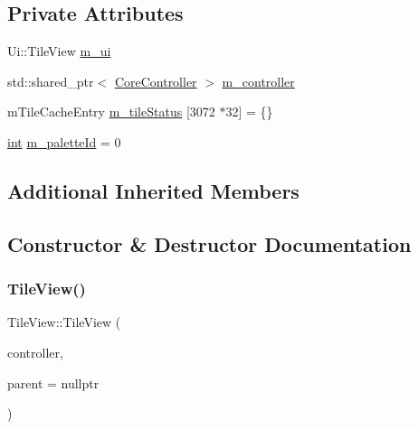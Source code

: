 \subsection*{Private Attributes}
\begin{DoxyCompactItemize}
\item 
Ui\+::\+Tile\+View \mbox{\hyperlink{class_q_g_b_a_1_1_tile_view_a39583b2b32b232918e23c63deb5f2113}{m\+\_\+ui}}
\item 
std\+::shared\+\_\+ptr$<$ \mbox{\hyperlink{class_q_g_b_a_1_1_core_controller}{Core\+Controller}} $>$ \mbox{\hyperlink{class_q_g_b_a_1_1_tile_view_a66508a82664b6f7160c35445481ed170}{m\+\_\+controller}}
\item 
m\+Tile\+Cache\+Entry \mbox{\hyperlink{class_q_g_b_a_1_1_tile_view_a56211cc11156c156d156f11f1395ba9e}{m\+\_\+tile\+Status}} \mbox{[}3072 $\ast$32\mbox{]} = \{\}
\item 
\mbox{\hyperlink{ioapi_8h_a787fa3cf048117ba7123753c1e74fcd6}{int}} \mbox{\hyperlink{class_q_g_b_a_1_1_tile_view_a9a230b2cb71c7c9416d6573cc36242ee}{m\+\_\+palette\+Id}} = 0
\end{DoxyCompactItemize}
\subsection*{Additional Inherited Members}


\subsection{Constructor \& Destructor Documentation}
\mbox{\label{class_q_g_b_a_1_1_tile_view_af2a7f266052e05ca0a2378f63d6fb228}} 
\subsubsection{\texorpdfstring{Tile\+View()}{TileView()}}
{\footnotesize\ttfamily Tile\+View\+::\+Tile\+View (\begin{DoxyParamCaption}\item[{std\+::shared\+\_\+ptr$<$ \mbox{\hyperlink{class_q_g_b_a_1_1_core_controller}{Core\+Controller}} $>$}]{controller,  }\item[{Q\+Widget $\ast$}]{parent = {\ttfamily nullptr} }\end{DoxyParamCaption})}

